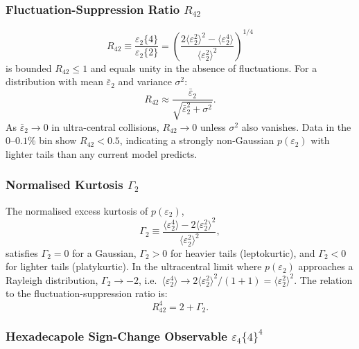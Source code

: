 \documentclass[12pt,a4paper,twoside]{report}
\newcommand{\mean}[1]{\langle #1 \rangle}
\begin{document}
\subsubsection{Fluctuation-Suppression Ratio \texorpdfstring{$R_{42}$}{R42}}

\begin{equation}
  R_{42} \equiv \frac{\varepsilon_2\{4\}}{\varepsilon_2\{2\}}
  = \left(\frac{2\mean{\varepsilon_2^2}^2 - \mean{\varepsilon_2^4}}
               {\mean{\varepsilon_2^2}^2}\right)^{1/4}
  \label{eq:R42}
\end{equation}
is bounded $R_{42} \leq 1$ and equals unity in the absence of
fluctuations.  For a distribution with mean $\bar{\varepsilon}_2$
and variance $\sigma^2$:
\begin{equation}
  R_{42} \approx \frac{\bar{\varepsilon}_2}
                       {\sqrt{\bar{\varepsilon}_2^2 + \sigma^2}}.
  \label{eq:R42_approx}
\end{equation}
As $\bar{\varepsilon}_2 \to 0$ in ultra-central collisions,
$R_{42} \to 0$ unless $\sigma^2$ also vanishes.  Data in the $0$--$0.1\%$
bin show $R_{42} < 0.5$, indicating a strongly non-Gaussian
$p(\varepsilon_2)$ with lighter tails than any current model predicts.

\subsubsection{Normalised Kurtosis \texorpdfstring{$\Gamma_2$}{Gamma2}}

The normalised excess kurtosis of $p(\varepsilon_2)$,
\begin{equation}
  \Gamma_2 \equiv
  \frac{\mean{\varepsilon_2^4} - 2\mean{\varepsilon_2^2}^2}
       {\mean{\varepsilon_2^2}^2},
  \label{eq:Gamma2}
\end{equation}
satisfies $\Gamma_2 = 0$ for a Gaussian,
$\Gamma_2 > 0$ for heavier tails (leptokurtic), and
$\Gamma_2 < 0$ for lighter tails (platykurtic).
In the ultracentral limit where $p(\varepsilon_2)$ approaches a
Rayleigh distribution, $\Gamma_2 \to -2$, i.e.\
$\mean{\varepsilon_2^4} \to 2\mean{\varepsilon_2^2}^2 / (1+1)
= \mean{\varepsilon_2^2}^2$.
The relation to the fluctuation-suppression ratio is:
\begin{equation}
  R_{42}^4 = 2 + \Gamma_2.
  \label{eq:R42_Gamma2}
\end{equation}

\subsubsection{Hexadecapole Sign-Change Observable
  \texorpdfstring{$\varepsilon_4\{4\}^4$}{e4(4)4}}
\end{document}
